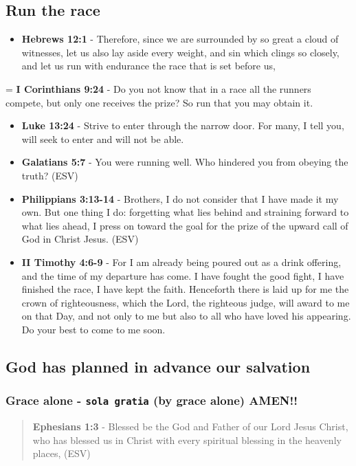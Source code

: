 \documentclass[11pt]{article}
\begin{document}
\subsection{Run the race}
\label{sec:org83b97a6}
\begin{itemize}
\item \textbf{Hebrews 12:1} - Therefore, since we are surrounded by so great a cloud of witnesses, let us also lay aside every weight, and sin which clings so closely, and let us run with endurance the race that is set before us,
\end{itemize}
= \textbf{I Corinthians 9:24} - Do you not know that in a race all the runners compete, but only one receives the prize? So run that you may obtain it.
\begin{itemize}
\item \textbf{Luke 13:24} - Strive to enter through the narrow door. For many, I tell you, will seek to enter and will not be able.
\item \textbf{Galatians 5:7} - You were running well. Who hindered you from obeying the truth? (ESV)
\item \textbf{Philippians 3:13-14} - Brothers, I do not consider that I have made it my own. But one thing I do: forgetting what lies behind and straining forward to what lies ahead, I press on toward the goal for the prize of the upward call of God in Christ Jesus. (ESV)
\item \textbf{II Timothy 4:6-9} - For I am already being poured out as a drink offering, and the time of my departure has come. I have fought the good fight, I have finished the race, I have kept the faith. Henceforth there is laid up for me the crown of righteousness, which the Lord, the righteous judge, will award to me on that Day, and not only to me but also to all who have loved his appearing. Do your best to come to me soon.
\end{itemize}

\subsection{God has planned in advance our salvation}
\label{sec:org594e92e}
\subsubsection{Grace alone - \texttt{sola gratia} (by grace alone) AMEN!!}
\label{sec:org2ef773c}
\begin{quote}
\textbf{Ephesians 1:3} - Blessed be the God and Father of our Lord Jesus Christ, who has blessed us in Christ with every spiritual blessing in the heavenly places, (ESV)
\end{quote}
\end{document}
